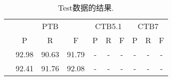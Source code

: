 \begin{table*}[tb]
    \centering
    \caption{Test数据的结果.}
    \begin{tabularx}{\textwidth}{lccccccccc}
        \toprule
                                                        & \multicolumn{3}{c}{PTB}  & \multicolumn{3}{c}{CTB5.1} & \multicolumn{3}{c}{CTB7}                                                                                                                                     \\
                                                        & P                        & R                          & F                        & P                        & R                        & F                        & P              & R              & F              \\
        \midrule
        \cite{stern-etal-2017-minimal}                  & 92.98                    & 90.63                      & 91.79                    & -                        & -                        & -                        & -              & -              & -              \\
        \cite{gaddy-etal-2018-whats}                    & 92.41                    & 91.76                      & 92.08                    & -                        & -                        & -                        & -              & -              & -              \\

\end{tabularx}
\end{table*}
